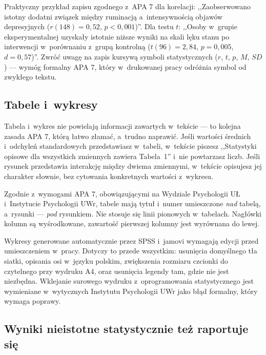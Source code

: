 \documentclass[12pt,a4paper,twoside,openany]{book}
\begin{document}
Praktyczny przykład zapisu zgodnego z~APA 7 dla korelacji: ,,Zaobserwowano istotny dodatni związek między ruminacją a~intensywnością objawów depresyjnych ($r(148) = 0{,}52$, $p < 0{,}001$)''. Dla testu $t$: ,,Osoby w~grupie eksperymentalnej uzyskały istotnie niższe wyniki na skali lęku stanu po interwencji w~porównaniu z~grupą kontrolną ($t(96) = 2{,}84$, $p = 0{,}005$, $d = 0{,}57$)''. Zwróć uwagę na zapis kursywą symboli statystycznych ($r$, $t$, $p$, $M$, $SD$) --- wymóg formalny APA 7, który w~drukowanej pracy odróżnia symbol od zwykłego tekstu.

\subsection{Tabele i~wykresy}

Tabela i~wykres nie powielają informacji zawartych w~tekście --- to kolejna zasada APA 7, którą łatwo złamać, a~trudno naprawić. Jeśli wartości średnich i~odchyleń standardowych przedstawiasz w~tabeli, w~tekście piszesz ,,Statystyki opisowe dla wszystkich zmiennych zawiera Tabela~1'' i~nie powtarzasz liczb. Jeśli rysunek przedstawia interakcję między dwiema zmiennymi, w~tekście opisujesz jej charakter słownie, bez cytowania konkretnych wartości z~wykresu.

Zgodnie z~wymogami APA 7, obowiązującymi na Wydziale Psychologii UŁ i~Instytucie Psychologii UWr, tabele mają tytuł i~numer umieszczone \emph{nad} tabelą, a~rysunki --- \emph{pod} rysunkiem. Nie stosuje się linii pionowych w~tabelach. Nagłówki kolumn są wyśrodkowane, zawartość pierwszej kolumny jest wyrównana do lewej.

\begin{tipbox}
Wykresy generowane automatycznie przez SPSS i~jamovi wymagają edycji przed umieszczeniem w~pracy. Dotyczy to przede wszystkim: usunięcia domyślnego tła siatki, opisania osi w~języku polskim, zwiększenia rozmiaru czcionki do czytelnego przy wydruku A4, oraz usunięcia legendy tam, gdzie nie jest niezbędna. Wklejanie surowego wydruku z~oprogramowania statystycznego jest wymieniane w~wytycznych Instytutu Psychologii UWr jako błąd formalny, który wymaga poprawy.
\end{tipbox}

\subsection{Wyniki nieistotne statystycznie też raportuje się}
\end{document}
